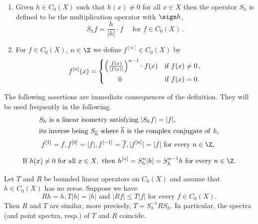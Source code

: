 \begin{definition}\label{def:b3-2.2}
\begin{enumerate}

\item
Given $h \in C_{0}(X)$ such that $h(x) \neq 0$ for all $x \in X$ then the operator $S_{h}$ is defined to be the multiplication operator with $ \sign h $, \ie
		\begin{equation}\label{eq:b3-2.3}
			S_{h}f = \frac{h}{|h|}\cdot f \quad\text{ for } f \in C_{0}(X)\,.
		\end{equation}
		
\item
For $f \in C_{0}(X)$, $n \in \Z$ we define $f^{[n]} \in C_{0}(X)$ by
\begin{equation}\label{eq:b3-2.4}
	f^{[n]}(x) = 
	\begin{cases}
        \mleft(\frac{f(x)}{|f(x)|}\mright)^{n-1}
        \cdot f(x) & \text{if } f(x) \neq 0\,,\\			
			\qquad 0 \rule{0ex}{3ex}& \text{if } f(x) = 0.
			\end{cases}
\end{equation}
\end{enumerate}
\end{definition}
The following assertions are immediate consequences of the definition. 
They will be used frequently in the following.
\begin{equation}\label{eq:b3-2.5}
	\begin{split}
		&S_{h} \text{  is a linear isometry satisfying  } |S_{h}f| = |f|, \\ 
		&\text{its inverse being  } S_{\overline{h}} \text{  where  } \overline{h} \text{ is the complex conjugate of\/ $ h $,}
	\end{split}
\end{equation}
\begin{equation}\label{eq:b3-2.6}
	    f^{[1]} = f, f^{[0]} = |f|, f^{[-1]} = \overline{f}, |f^{[n]}| = |f| \text{  for every $n \in \Z$, }
\end{equation}
\begin{equation}\label{eq:b3-2.7}\rule{0ex}{3ex}
	\text{If  } h(x) \neq 0 \text{  for all  } x \in X, \text{  then  } h^{[n]} = S_{h}^{n}|h| = S_{h}^{n-1}h
	\text{  for every $ n \in \Z $.} 
\end{equation}
\begin{lemma}\label{lem:b3-2.3}%
Let $T$ and $R$ be bounded linear operators on $C_{0}(X)$ and assume that $h \in C_{0}(X)$ has no zeros. 
Suppose we have
\begin{equation}\label{eq:b3-2.8}
	Rh = h, T|h| = |h| \text{ and } |Rf| \leq T|f| \text{ for every $f \in C_{0}(X)$.} 
\end{equation}
Then $R$ and $T$ are similar, more precisely, $T = S_{h}^{-1}RS_{h}$.
In particular, the spectra (and point spectra, resp.) of\/ $T$ and $R$ coincide.
\end{lemma}
